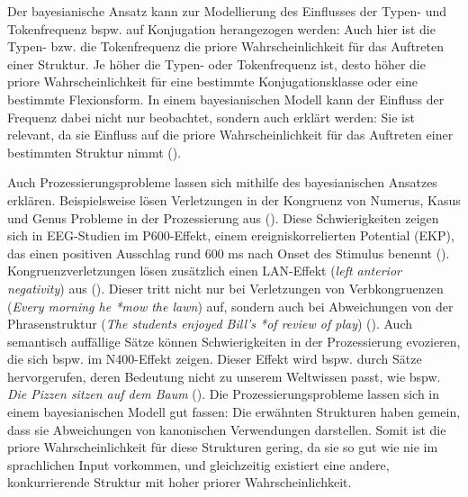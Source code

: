 Der bayesianische Ansatz kann zur Modellierung des Einflusses der Typen- und Tokenfrequenz bspw. auf Konjugation herangezogen werden: Auch hier ist die Typen- bzw. die Tokenfrequenz die priore Wahrscheinlichkeit für das Auftreten einer Struktur. Je höher die Typen- oder Tokenfrequenz ist, desto höher die priore Wahrscheinlichkeit für eine bestimmte Konjugationsklasse oder eine bestimmte Flexionsform. In einem bayesianischen Modell kann der Einfluss der Frequenz dabei nicht nur beobachtet, sondern auch erklärt werden: Sie ist relevant, da sie Einfluss auf die priore Wahrscheinlichkeit für das Auftreten einer bestimmten Struktur nimmt (\cite[157]{Jurafsky.1996}).
 
Auch Prozessierungsprobleme lassen sich mithilfe des bayesianischen Ansatzes erklären. Beispielsweise lösen Verletzungen in der Kongruenz von Numerus, Kasus und Genus Probleme in der Prozessierung aus (\cites{Osterhout.1994}{Kaan.2003}[150--151]{Gouvea.2010}). Diese Schwierigkeiten zeigen sich in EEG-Studien im P600-Effekt, einem ereigniskorrelierten Potential (EKP), das einen positiven Ausschlag rund 600 ms nach Onset des Stimulus benennt (\cites[169--172]{Kaan.2000}[155--156]{Gouvea.2010}). Kongruenzverletzungen lösen zusätzlich einen LAN-Effekt (\textit{left anterior negativity}) aus (\cite[878]{Roehm.2005}). Dieser tritt nicht nur bei Verletzungen von Verbkongruenzen (\textit{Every morning he *mow the lawn}) auf, sondern auch bei Abweichungen von der Phrasenstruktur (\textit{The students enjoyed Bill's *of review of play}) (\cites{Hahne.1999}[150--151]{Gouvea.2010}).  Auch semantisch auffällige Sätze können Schwierigkeiten in der Prozessierung evozieren, die sich bspw. im N400-Effekt zeigen. Dieser Effekt wird bspw. durch Sätze hervorgerufen, deren Bedeutung nicht zu unserem Weltwissen passt, wie bspw. \textit{Die Pizzen sitzen auf dem Baum} (\cite[540]{Kutas.1983}). Die Prozessierungsprobleme lassen sich in einem bayesianischen Modell gut fassen: Die erwähnten Strukturen haben gemein, dass sie Abweichungen von kanonischen Verwendungen darstellen. Somit ist die priore Wahrscheinlichkeit für diese Strukturen gering, da sie so gut wie nie im sprachlichen Input vorkommen, und gleichzeitig existiert eine andere, konkurrierende Struktur mit hoher priorer Wahrscheinlichkeit.   


